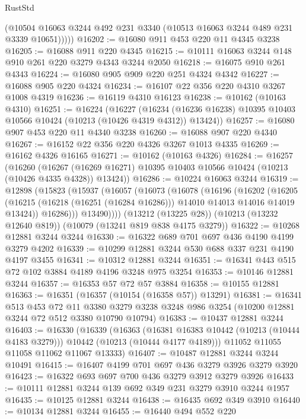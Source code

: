 \begin{lexlean}{RustStd}
\begin{coremodule}
          (@10504 @16063 @3244 @492 @231 @3340 (@10513 @16063 @3244 @489 @231 @3339 @10651)))))
@16202 := @16080 @911 @453 @220 @11 @4345 @3238
@16205 := @16088 @911 @220 @4345
@16215 := @10111 @16063 @3244 @148 @910 @261 @220 @3279 @4343 @3244 @2050
@16218 := @16075 @910 @261 @4343
@16224 := @16080 @905 @909 @220 @251 @4324 @4342
@16227 := @16088 @905 @220 @4324
@16234 := @16107 @22 @356 @220 @4310 @3267 @1008 @4319
@16236 := @16119 @4310 @16123
@16238 := @10162 (@10163 @4310)
@16251 := @16224
    (@16227
      (@16234 (@16236 @16238) @10395 @10403 @10566 @10424 (@10213 (@10426 @4319 @4312)) @13424))
@16257 := @16080 @907 @453 @220 @11 @4340 @3238
@16260 := @16088 @907 @220 @4340
@16267 := @16152 @22 @356 @220 @4326 @3267 @1013 @4335
@16269 := @16162 @4326 @16165
@16271 := @10162 (@10163 @4326)
@16284 := @16257
    (@16260
      (@16267 (@16269 @16271) @10395 @10403 @10566 @10424 (@10213 (@10426 @4335 @4328)) @13424))
@16286 := @10224 @16063 @3244
@16319 := @12898
    (@15823
      (@15937
        (@16057
          (@16073
            (@16078
              (@16196
                (@16202
                  (@16205
                    (@16215 (@16218 (@16251 (@16284 @16286))) @14010 @14013 @14016 @14019 @13424))
                  @16286)))
            @13490))))
    (@13212 (@13225 @28))
    (@10213 (@13232 @12640 @819))
    (@10079 (@13241 @819 @838 @4175 @3279))
@16322 := @10268 @12881 @3244 @3244
@16330 := @16322 @689 @701 @697 @436 @4190 @4199 @3279 @4202
@16339 := @10299 @12881 @3244 @530 @688 @337 @231 @4190 @4197 @3455
@16341 := @10312 @12881 @3244
@16351 := @16341 @443 @515 @72 @102 @3884 @4189 @4196 @3248 @975 @3254
@16353 := @10146 @12881 @3244
@16357 := @16353 @57 @72 @57 @3884
@16358 := @10155 @12881
@16363 := @16351 (@16357 (@10154 (@16358 @57)) @13291)
@16381 := @16341
    @513
    @453
    @72
    @11
    @3380
    @3279
    @3238
    @3248
    @986
    @3254
    (@10200 @12881 @3244 @72 @512 @3380 @10790 @10794)
@16383 := @10437 @12881 @3244
@16403 := @16330
    (@16339
      (@16363
        (@16381 @16383 @10442 (@10213 (@10444 @4183 @3279)))
        @10442
        (@10213 (@10444 @4177 @4189)))
      @11052
      @11055
      @11058
      @11062
      @11067
      @13333)
@16407 := @10487 @12881 @3244 @3244 @10491
@16415 := @16407 @4199 @701 @697 @436 @3279 @3926 @3279 @3920
@16423 := @16322 @693 @697 @700 @436 @3279 @3912 @3279 @3926
@16433 := @10111 @12881 @3244 @139 @692 @349 @231 @3279 @3910 @3244 @1957
@16435 := @10125 @12881 @3244
@16438 := @16435 @692 @349 @3910
@16440 := @10134 @12881 @3244
@16455 := @16440
    @494
    @552
    @220

\end{coremodule}
\end{lexlean}
